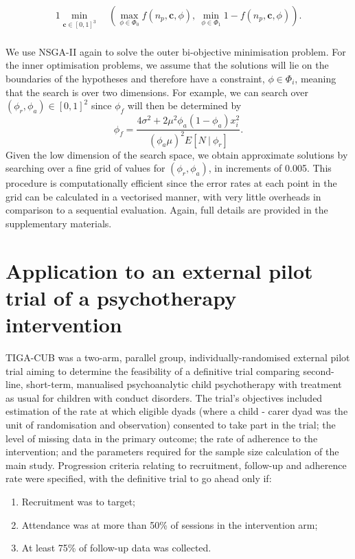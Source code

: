 \documentclass[AMA,STIX1COL]{WileyNJD-v2}
\begin{document}
\begin{alignat*}{1}
\min_{\mathbf{c} \in [0,1]^3} ~ & \left( \max_{\phi \in \Phi_0} f(n_p, \mathbf{c}, \phi) , ~ \min_{\phi \in \Phi_1} 1 - f(n_p, \mathbf{c}, \phi) \right). \\
\end{alignat*}

We use NSGA-II again to solve the outer bi-objective minimisation problem. For the inner optimisation problems, we assume that the solutions will lie on the boundaries of the hypotheses and therefore have a constraint, $\phi \in \Phi_i$, meaning that the search is over two dimensions. For example, we can search over $(\phi_r, \phi_a) \in [0,1]^2$ since $\phi_f$ will then be determined by
$$
\phi_f = \frac{4\sigma^2 + 2\mu^2 \phi_a(1-\phi_a)x_i^2}{(\phi_a \mu)^2 E[N ~|~ \phi_r]}.
$$
Given the low dimension of the search space, we obtain approximate solutions by searching over a fine grid of values for $(\phi_r, \phi_a)$, in increments of 0.005. This procedure is computationally efficient since the error rates at each point in the grid can be calculated in a vectorised manner, with very little overheads in comparison to a sequential evaluation. Again, full details are provided in the supplementary materials. 

\section{Application to an external pilot trial of a psychotherapy intervention}\label{sec:example}

TIGA-CUB \cite{Edginton2017} was a two-arm, parallel group, individually-randomised external pilot trial aiming to determine the feasibility of a definitive trial comparing second-line, short-term, manualised psychoanalytic child psychotherapy with treatment as usual for children with conduct disorders. The trial's objectives included estimation of the rate at which eligible dyads (where a child - carer dyad was the unit of randomisation and observation) consented to take part in the trial; the level of missing data in the primary outcome; the rate of adherence to the intervention; and the parameters required for the sample size calculation of the main study. Progression criteria relating to recruitment, follow-up and adherence rate were specified, with the definitive trial to go ahead only if:
\begin{enumerate}
\item Recruitment was to target;
\item Attendance was at more than 50\% of sessions in the intervention arm;
\item At least 75\% of follow-up data was collected.
\end{enumerate}
\end{document}
